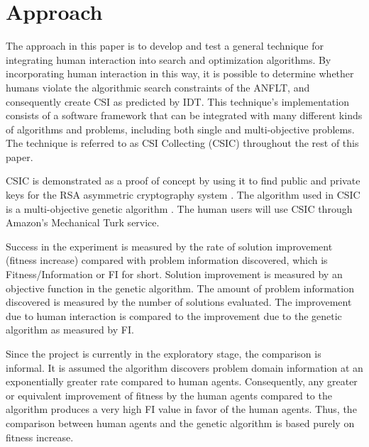 \section{Approach}\label{sec:solution-approach}

The approach in this paper is to develop and test a general technique for integrating  human interaction into search and optimization algorithms.  By incorporating human interaction in this way, it is possible to determine whether humans violate the algorithmic search constraints of the ANFLT, and consequently create CSI as predicted by IDT.  This technique's implementation consists of a software framework that can be integrated with many different kinds of algorithms and problems, including both single and multi-objective problems.  The technique is referred to as  CSI Collecting (CSIC) throughout the rest of this paper.

CSIC is demonstrated as a proof of concept by using it to find public and private keys for the 
RSA 
asymmetric cryptography system 
\citep{cormen01:_introd_to_algor}.  The algorithm used in CSIC is a multi-objective genetic algorithm .  The human users will use CSIC through Amazon's Mechanical Turk service.  

   Success in the experiment is measured by the rate of solution improvement (fitness increase) compared with problem information discovered, which is Fitness/Information or FI for short.  Solution improvement is measured by an objective function in the genetic algorithm.  The amount of problem information discovered is measured by the number of solutions evaluated.  The improvement due to human interaction is compared to the improvement due to the genetic algorithm as measured by FI.  

Since the project is currently in the exploratory stage, the comparison is informal.  It is assumed the algorithm discovers problem domain information at an exponentially greater rate compared to human agents.  Consequently, any greater or equivalent improvement of fitness by the human agents compared to the algorithm produces a very high FI value in favor of the human agents.  Thus, the comparison between human agents and the genetic algorithm is based purely on fitness increase.


